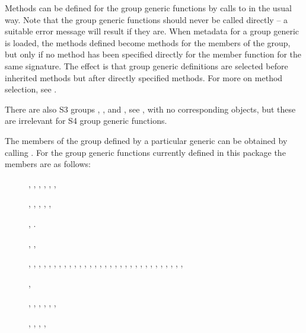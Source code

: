 \begin{Details}\relax
Methods can be defined for the group generic functions by calls to
 in the usual way.
Note that the group generic functions
should never be called directly
-- a suitable error message will result if they are.  When metadata
for a group generic is loaded, the methods defined become methods
for the members of the group, but only if no method has been
specified directly for the member function for the same signature.
The effect is that group generic definitions are selected before
inherited methods but after directly specified methods.  For more on
method selection, see .

There are also
S3 groups , ,  and
, see ,
with no corresponding \R{} objects, but these are irrelevant for S4
group generic functions.

The members of the group defined by a particular generic can be
obtained by calling . For the group
generic functions currently defined in this package the members are
as follows:
\begin{description}

\item[] , , , ,
, , 
\item[] , , ,
, , 
\item[] , .

\item[] , , 
\item[] , , ,
, , ,
, , , ,
, , , ,
, ,
, , , ,
, , , ,
, , , ,
, , ,

\item[] , 
\item[] , , ,
, , , 
\item[] , , ,
, 


\end{description}
\end{Details}
